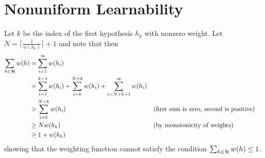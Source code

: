 \chapter{Nonuniform Learnability}

\begin{ex}
\end{ex}

\begin{ex}
  Let $k$ be the index of the first hypothesis $h_k$ with nonzero weight. Let
  $N=\lceil \frac{1}{w(h_k)} \rceil +1$ and note that then
  \begin{align*}
    \sum_{h\in\mathcal{H}} w(h)
     & =\sum_{i=1}^\infty w(h_i)                                                                             \\
     & =\sum_{i=1}^{k-1} w(h_i) +\sum_{i=k}^{N+k} w(h_i)
    +\sum_{i=N+k+1}^\infty w(h_i)                                                                            \\
     & > \sum_{i=k}^{N+k} w(h_i)                         &  & \text{(first sum is zero, second is positive)} \\
     & \geq N w(h_k)                                     &  & \text{(by monotonicity of weights)}            \\
     & \geq 1 + w(h_k)
  \end{align*}
  showing that the weighting function cannot satisfy the condition
  $\sum_{h\in\mathcal{H}}w(h)\leq 1$.
\end{ex}

\begin{ex}
\end{ex}

\begin{ex}
\end{ex}

\begin{ex}
\end{ex}

\begin{ex}
\end{ex}